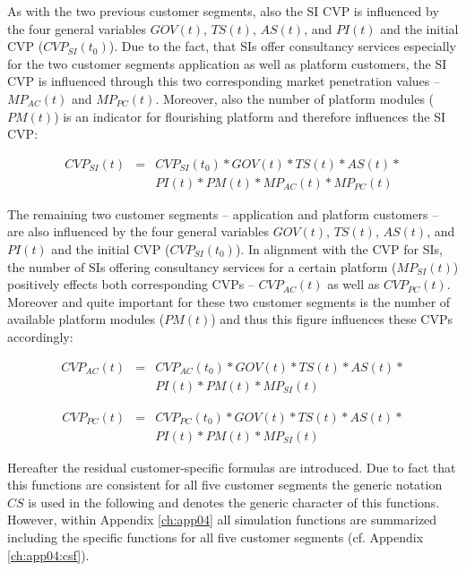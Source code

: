 As with the two previous customer segments, also the \ac{SI} \ac{CVP} is influenced by the four general variables $GOV(t)$, $TS(t)$, $AS(t)$, and $PI(t)$ and the initial \ac{CVP} ($CVP_{SI}(t_0)$). Due to the fact, that \acp{SI} offer consultancy services especially for the two customer segments application as well as platform customers, the \ac{SI} \ac{CVP} is influenced through this two corresponding market penetration values -- $MP_{AC}(t)$ and $MP_{PC}(t)$. Moreover, also the number of platform modules ($PM(t)$) is an indicator for flourishing platform and therefore influences the \ac{SI} \ac{CVP}:

\begin{eqnarray}\label{eq:cvp:si}
		CVP_{SI}(t) & = & CVP_{SI}(t_0) * GOV(t) * TS(t) * AS(t) * \nonumber \\ & & PI(t) * PM(t) * MP_{AC}(t) * MP_{PC}(t)
\end{eqnarray}

The remaining two customer segments -- application and platform customers -- are also influenced by the four general variables $GOV(t)$, $TS(t)$, $AS(t)$, and $PI(t)$ and the initial \ac{CVP} ($CVP_{SI}(t_0)$). In alignment with the \ac{CVP} for \acp{SI}, the number of \acp{SI} offering consultancy services for a certain platform ($MP_{SI}(t)$) positively effects both corresponding \acp{CVP} -- $CVP_{AC}(t)$ as well as $CVP_{PC}(t)$. Moreover and quite important for these two customer segments is the number of available platform modules ($PM(t)$) and thus this figure influences these \acp{CVP} accordingly:

\begin{eqnarray}\label{eq:cvp:ac}
		CVP_{AC}(t) & = & CVP_{AC}(t_0) * GOV(t) * TS(t) * AS(t) * \nonumber \\ & & PI(t) * PM(t) * MP_{SI}(t)
\end{eqnarray}

\begin{eqnarray}\label{eq:cvp:pc}
		CVP_ {PC}(t) & = & CVP_{PC}(t_0) * GOV(t) * TS(t) * AS(t) * \nonumber \\ & & PI(t) * PM(t) * MP_{SI}(t)
\end{eqnarray}

Hereafter the residual customer-specific formulas are introduced. Due to fact that this functions are consistent for all five customer segments the generic notation $CS$ is used in the following and denotes the generic character of this functions. However, within Appendix \ref{ch:app04} all simulation functions are summarized including the specific functions for all five customer segments (cf. Appendix \ref{ch:app04:csf}).

